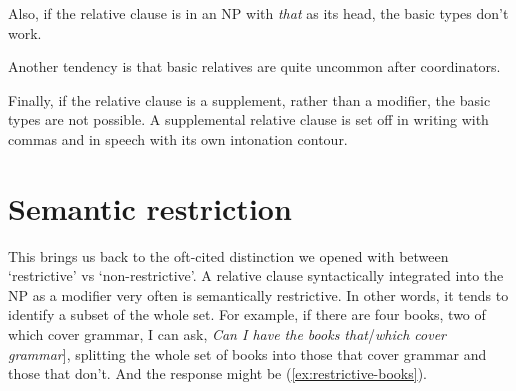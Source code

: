Also, if the relative clause is in an NP with \textit{that} as its head, the basic types don't work.

\ea
    \z
\z

Another tendency is that basic relatives are quite uncommon after coordinators.

\ea
    \z
\z

Finally, if the relative clause is a supplement, rather than a modifier, the basic types are not possible. A supplemental relative clause is set off in writing with commas and in speech with its own intonation contour.

\ea
    \z
\z
{}

\section{Semantic restriction}

This brings us back to the oft-cited distinction we opened with between `restrictive' vs `non-restrictive'. A relative clause syntactically integrated into the NP as a modifier very often is semantically restrictive. In other words, it tends to identify a subset of the whole set. For example, if there are four books, two of which cover grammar, I can ask, \textit{Can I have the books \ob that}/\textit{which cover grammar}], splitting the whole set of books into those that cover grammar and those that don't. And the response might be (\ref{ex:restrictive-books}).

\label{ex:restrictive-books}
\z

